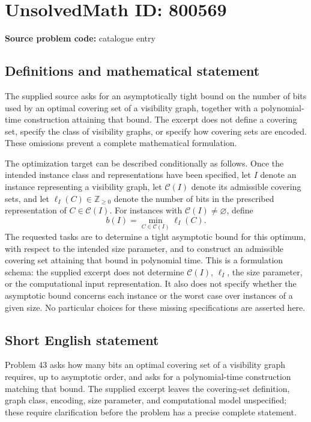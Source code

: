 \documentclass[11pt]{article}
\newcommand{\Z}{\mathbb{Z}}
\begin{document}
\section*{UnsolvedMath ID: 800569}
\textbf{Source problem code:} catalogue entry
\subsection{Definitions and mathematical statement}
The supplied source asks for an asymptotically tight bound on the number of bits used by an optimal covering set of a visibility graph, together with a polynomial-time construction attaining that bound. The excerpt does not define a covering set, specify the class of visibility graphs, or specify how covering sets are encoded. These omissions prevent a complete mathematical formulation.

The optimization target can be described conditionally as follows. Once the intended instance class and representations have been specified, let \(I\) denote an instance representing a visibility graph, let \(\mathcal{C}(I)\) denote its admissible covering sets, and let \(\ell_I(C)\in\Z_{\geq 0}\) denote the number of bits in the prescribed representation of \(C\in\mathcal{C}(I)\). For instances with \(\mathcal{C}(I)\neq\varnothing\), define
\[
 b(I)=\min_{C\in\mathcal{C}(I)}\ell_I(C).
\]
The requested tasks are to determine a tight asymptotic bound for this optimum, with respect to the intended size parameter, and to construct an admissible covering set attaining that bound in polynomial time. This is a formulation schema: the supplied excerpt does not determine \(\mathcal{C}(I)\), \(\ell_I\), the size parameter, or the computational input representation. It also does not specify whether the asymptotic bound concerns each instance or the worst case over instances of a given size. No particular choices for these missing specifications are asserted here.
\subsection{Short English statement}
Problem 43 asks how many bits an optimal covering set of a visibility graph requires, up to asymptotic order, and asks for a polynomial-time construction matching that bound. The supplied excerpt leaves the covering-set definition, graph class, encoding, size parameter, and computational model unspecified; these require clarification before the problem has a precise complete statement.
\end{document}
